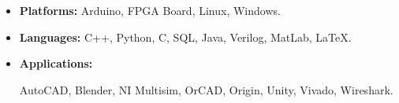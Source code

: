 \begin{itemize}
    \item 
    \textbf{Platforms:} Arduino, FPGA Board, Linux, Windows.
    \item 
    \textbf{Languages:} C++, Python, C, SQL, Java, Verilog, MatLab, \LaTeX.
    \item 
    \textbf{Applications:} 
    \begin{minipage}[t]{\skillwidth}
        AutoCAD, Blender, NI Multisim, OrCAD, Origin, 
        Unity, Vivado, Wireshark.
    \end{minipage}
\end{itemize}
